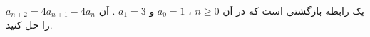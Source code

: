 \EXERCISE
$a_{n+2} = 4a_{n+1} - 4a_n$
یک رابطه بازگشتی است که در آن
$n \geq 0$
،
$a_0 = 1$
و
$a_1 = 3$
. آن را حل کنید.